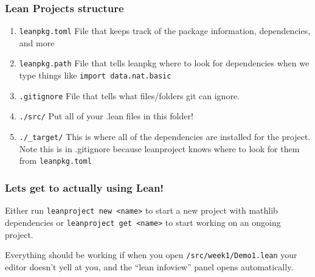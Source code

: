 \documentclass{beamer}
\begin{document}
\begin{frame}[fragile]
    \frametitle{Lean Projects structure}
    \begin{enumerate}
        \item \verb!leanpkg.toml! File that keeps track of the package information, dependencies, and more
        \item \verb!leanpkg.path! File that tells leanpkg where to look for dependencies when we type things like \verb!import data.nat.basic!
        \item \verb!.gitignore! File that tells what files/folders git can ignore. 
        \item \verb!./src/! Put all of your .lean files in this folder!
        \item \verb!./_target/! This is where all of the dependencies are installed for the project. Note this is in .gitignore because leanproject knows where to look for them from \verb!leanpkg.toml!
    \end{enumerate}
\end{frame}

\begin{frame}[fragile]
    \frametitle{Lets get to actually using Lean!}

    Either run \verb!leanproject new <name>! to start a new project with mathlib dependencies or \verb!leanproject get <name>! to start working on an ongoing project. 
    \vspace{10pt}

    Everything should be working if when you open \verb!/src/week1/Demo1.lean! your editor doesn't yell at you, and the ``lean infoview'' panel opens automatically. 
\end{frame}
\end{document}
